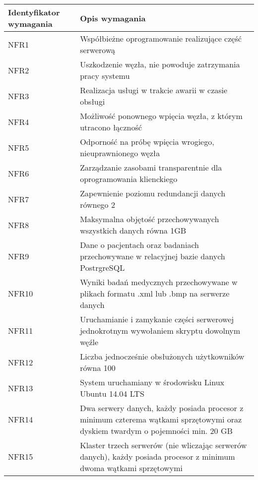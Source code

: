   \begin{longtable}{| p{} || p{} |} 
\hline
\textbf{Identyfikator wymagania} & \textbf{Opis wymagania} \\ \hline
NFR1 & Współbieżne oprogramowanie realizujące część serwerową \\ \hline
NFR2 & Uszkodzenie węzła, nie powoduje zatrzymania pracy systemu
 \\ \hline
NFR3 & Realizacja usługi w trakcie awarii w czasie obsługi
 \\ \hline
NFR4 & Możliwość ponownego wpięcia węzła, z którym utracono łączność
 \\ \hline
NFR5 & Odporność na próbę wpięcia wrogiego, nieuprawnionego węzła
 \\ \hline
NFR6 & Zarządzanie zasobami transparentnie dla oprogramowania klienckiego
 \\ \hline
NFR7 & Zapewnienie poziomu redundancji danych równego 2
 \\ \hline
NFR8 & Maksymalna objętość przechowywanych wszystkich danych równa 1GB
 \\ \hline
NFR9 & Dane o pacjentach oraz badaniach przechowywane w relacyjnej bazie danych PostrgreSQL
 \\ \hline
NFR10 & Wyniki badań medycznych przechowywane w plikach formatu .xml lub .bmp na serwerze danych
 \\ \hline
NFR11 & Uruchamianie i zamykanie części serwerowej jednokrotnym wywołaniem skryptu dowolnym węźle
 \\ \hline
NFR12 & Liczba jednocześnie obsłużonych użytkowników równa 100
 \\ \hline
NFR13 & System uruchamiany w środowisku Linux Ubuntu 14.04 LTS
 \\ \hline
NFR14 & Dwa serwery danych, każdy posiada procesor z minimum czterema wątkami sprzętowymi oraz dyskiem twardym o pojemności min. 20 GB
 \\ \hline
NFR15 & Klaster trzech serwerów (nie wliczając serwerów danych), każdy posiada     procesor z minimum dwoma wątkami sprzętowymi
 \\ \hline
  \end{longtable}  
